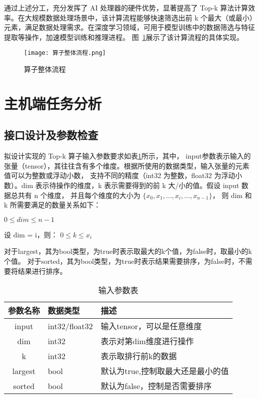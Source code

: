 通过上述分工，充分发挥了 AI 处理器的硬件优势，显著提高了 Top-k 算法计算效率。在大规模数据处理场景中，该计算流程能够快速筛选出前 k 个最大（或最小）元素，满足数据处理需求。在深度学习领域，可用于模型训练中的数据筛选与特征提取等操作，加速模型训练和推理进程。
图~\ref{fig:topk}展示了该计算流程的具体实现。
\begin{figure}[ht]
    \centering
    \texttt{[image: 算子整体流程.png]}
    \caption{算子整体流程}
    \label{fig:topk}
\end{figure}




\section{主机端任务分析}
    \subsection{接口设计及参数检查}
    拟设计实现的 Top-k 算子输入参数要求如表\ref{tab:input_tab}所示，其中，
    input参数表示输入的张量（tensor），其往往含有多个维度。根据所使用的数据类型，输入张量的元素值可以为整数或浮动小数，
    支持不同的精度（int32 为整数，float32 为浮动小数）。dim 表示待操作的维度，k 表示需要得到的前 k 大/小的值。假设 input 数据总共有 n 个维度，
    并且每个维度的大小为 $\{ x_{0}, x_{1}, \dots, x_{i}, \dots, x_{n-1} \}$，
    则 dim 和 k 所需要满足的数量关系如下：

    \begin{center}
        $0 \leq dim \leq n - 1$
        
        设 dim = i，则： $0 \leq k \leq x_{i}$
    \end{center}
    对于largest，其为bool类型，为true时表示取最大的k个值，为false时，取最小的k个值。
    对于sorted，其为bool类型，为true时表示结果需要排序，为false时，不需要将结果进行排序。
    \begin{table}
        \centering
        \caption{输入参数表}
        \label{tab:input_tab}
        \begin{tabular}{cll} %
          \toprule
          参数名称   & 数据类型                                       & 描述                          \\
          \midrule
          input & int32/float32 & 输入tensor，可以是任意维度                      \\
          dim & int32   & 表示对第dim维度进行操作            \\
          k   & int32   & 表示取排行前k的数据              \\
          largest & bool   & 默认为true,控制取最大还是最小的值            \\
          sorted & bool   & 默认为false，控制是否需要排序            \\
          
          \bottomrule
        \end{tabular}
    \end{table}

